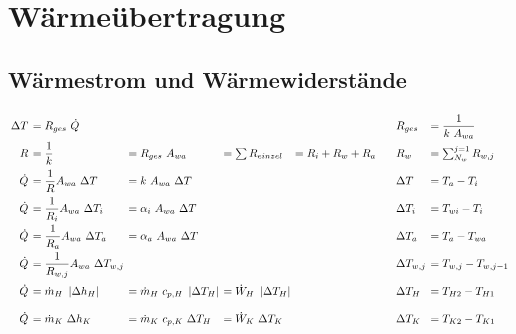 \setcounter{section}{2}

\section{Wärmeübertragung}

\subsection{Wärmestrom und Wärmewiderstände}
	\setlength{\abovedisplayskip}{-20pt}
	\[ \arraycolsep=0.2em  \def\arraystretch{1.8}
	\begin{array}{r l l l l p{1em} l l}
		\Delta T & = R_{ges}\ \dot{Q}                          &                                         &                               &                   &  & R_{ges}        & = \dfrac{1}{k\ A_{wa}}     \\
		R        & = \dfrac{1}{k}                              & = R_{ges}\ A_{wa}                       & = \sum R_{einzel}             & = R_i + R_w + R_a &  & R_w            & = \sum_{N_w}^{j=1} R_{w,j} \\
		\dot{Q}  & = \dfrac{1}{R} A_{wa}\   \Delta T           & = k\ A_{wa}\ \Delta T                   &                               &                   &  & \Delta T       & = T_a - T_i                \\
		\dot{Q}  & = \dfrac{1}{R_i} A_{wa}\ \Delta T_i         & = \alpha_i\ A_{wa}\ \Delta T            &                               &                   &  & \Delta T_i     & = T_{wi} - T_i             \\
		\dot{Q}  & = \dfrac{1}{R_a} A_{wa}\ \Delta T_a         & = \alpha_a\ A_{wa}\ \Delta T            &                               &                   &  & \Delta T_a     & = T_a - T_{wa}             \\
		\dot{Q}  & = \dfrac{1}{R_{w,j}} A_{wa}\ \Delta T_{w,j} &                                         &                               &                   &  & \Delta T_{w,j} & = T_{w,j} - T_{w,j-1}      \\
		\dot{Q}  & = \dot{m}_H\ \abs{\Delta h_H}               & =  \dot{m}_H\ c_{p,H}\ \abs{\Delta T_H} & = \dot{W}_H\ \abs{\Delta T_H} &                   &  & \Delta T_H     & = T_{H2} - T_{H1}          \\
		\dot{Q}  & = \dot{m}_K\ \Delta h_K                     & =  \dot{m}_K\ c_{p,K}\ \Delta T_H       & = \dot{W}_K\ \Delta T_K       &                   &  & \Delta T_K     & = T_{K2} - T_{K1}
	\end{array} \]


